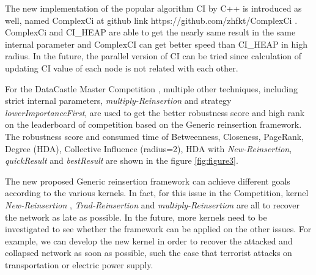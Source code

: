 \documentclass{article}
\begin{document}
	The new implementation of the popular algorithm CI by C++ is introduced as well, named ComplexCi at github link https://github.com/zhfkt/ComplexCi \cite{zhfktgithub}. ComplexCi and CI\_HEAP are able to get the nearly same result in the same internal parameter and ComplexCI can get better speed than CI\_HEAP in high radius.	In the future, the parallel version of CI can be tried since calculation of updating CI value of each node is not related with each other.
	
	For the DataCastle Master Competition , multiple other techniques, including strict internal parameters, \textit{multiply-Reinsertion} and strategy \textit{lowerImportanceFirst},  are used to get the better robustness score and high rank on the leaderboard of competition based on the Generic reinsertion framework. The robustness score and consumed time of Betweenness, Closeness, PageRank, Degree (HDA), Collective Influence (radius=2), HDA with \textit{New-Reinsertion}, \textit{quickResult} and \textit{bestResult} are shown in the figure \ref{fig:figure3}.
	
	The new proposed Generic reinsertion framework can achieve different goals according to the various kernels. In fact, for this issue in the Competition, kernel \textit{New-Reinsertion} , \textit{Trad-Reinsertion} and \textit{multiply-Reinsertion} are all to recover the network as late as possible. In the future, more kernels need to be investigated to see whether the framework can be applied on the other issues. For example, we can develop the new kernel in order to recover the attacked and collapsed network as soon as possible, such the case that terrorist attacks on transportation or electric power supply. 
	


	
	
	
	
	
	
	
	
\end{document}
